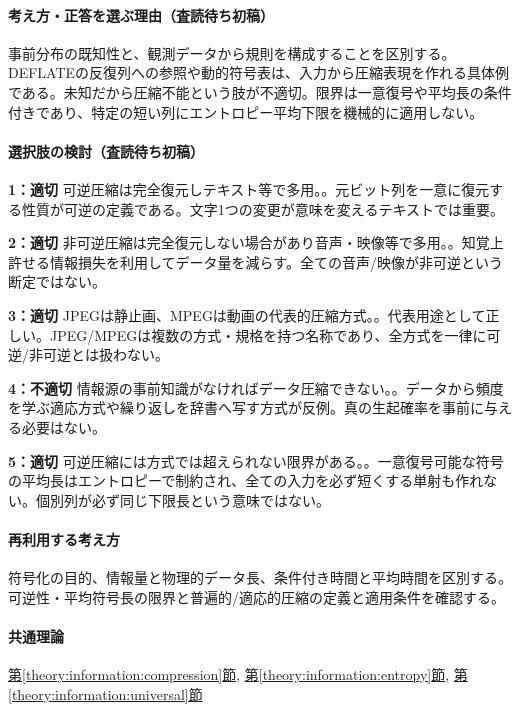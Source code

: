 \paragraph{考え方・正答を選ぶ理由（査読待ち初稿）} 事前分布の既知性と、観測データから規則を構成することを区別する。DEFLATEの反復列への参照や動的符号表は、入力から圧縮表現を作れる具体例である。未知だから圧縮不能という肢が不適切。限界は一意復号や平均長の条件付きであり、特定の短い列にエントロピー平均下限を機械的に適用しない。

\paragraph{選択肢の検討（査読待ち初稿）}\mbox{}\par

\noindent\textbf{1：適切} 可逆圧縮は完全復元しテキスト等で多用。。元ビット列を一意に復元する性質が可逆の定義である。文字1つの変更が意味を変えるテキストでは重要。\par

\noindent\textbf{2：適切} 非可逆圧縮は完全復元しない場合があり音声・映像等で多用。。知覚上許せる情報損失を利用してデータ量を減らす。全ての音声/映像が非可逆という断定ではない。\par

\noindent\textbf{3：適切} JPEGは静止画、MPEGは動画の代表的圧縮方式。。代表用途として正しい。JPEG/MPEGは複数の方式・規格を持つ名称であり、全方式を一律に可逆/非可逆とは扱わない。\par

\noindent\textbf{4：不適切} 情報源の事前知識がなければデータ圧縮できない。。データから頻度を学ぶ適応方式や繰り返しを辞書へ写す方式が反例。真の生起確率を事前に与える必要はない。\par

\noindent\textbf{5：適切} 可逆圧縮には方式では超えられない限界がある。。一意復号可能な符号の平均長はエントロピーで制約され、全ての入力を必ず短くする単射も作れない。個別列が必ず同じ下限長という意味ではない。\par

\paragraph{再利用する考え方} 符号化の目的、情報量と物理的データ長、条件付き時間と平均時間を区別する。可逆性・平均符号長の限界と普遍的/適応的圧縮の定義と適用条件を確認する。

\paragraph{共通理論} \hyperref[theory:information:compression]{第\ref*{theory:information:compression}節}, \hyperref[theory:information:entropy]{第\ref*{theory:information:entropy}節}, \hyperref[theory:information:universal]{第\ref*{theory:information:universal}節}


